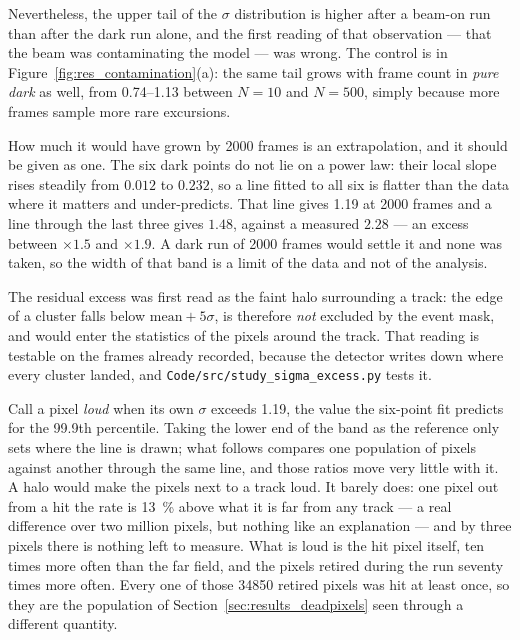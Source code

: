 \documentclass[a4paper,headsepline,oneside,11pt]{scrartcl}
\begin{document}
Nevertheless, the upper tail of the $\sigma$ distribution is higher after a
beam-on run than after the dark run alone, and the first reading of that
observation --- that the beam was contaminating the model --- was wrong. The
control is in Figure~\ref{fig:res_contamination}(a): the same tail grows with
frame count in \emph{pure dark} as well, from \SIrange[range-phrase={ to }]{0.74}{1.13}{\ADU} between
$N=10$ and $N=500$, simply because more frames sample more rare excursions.

How much it would have grown by 2000 frames is an extrapolation, and it should
be given as one. The six dark points do not lie on a power law: their local
slope rises steadily from $0.012$ to $0.232$, so a line fitted to all six is
flatter than the data where it matters and under-predicts. That line gives
\SI{1.19}{\ADU} at 2000 frames and a line through the last three gives $1.48$,
against a measured $2.28$ --- an excess between $\times 1.5$ and $\times 1.9$.
A dark run of 2000 frames would settle it and none was taken, so the width of
that band is a limit of the data and not of the analysis.

The residual excess was first read as the faint halo surrounding a track: the
edge of a cluster falls below $\text{mean} + 5\sigma$, is therefore \emph{not}
excluded by the event mask, and would enter the statistics of the pixels around
the track. That reading is testable on the frames already recorded, because the
detector writes down where every cluster landed, and
\texttt{Code/src/study\_sigma\_excess.py} tests it.

Call a pixel \emph{loud} when its own $\sigma$ exceeds \SI{1.19}{\ADU}, the
value the six-point fit predicts for the 99.9th percentile. Taking the lower end
of the band as the reference only sets where the line is drawn; what follows
compares one population of pixels against another through the same line, and
those ratios move very little with it. A halo would make the
pixels next to a track loud. It barely does: one pixel out from a hit the rate
is \SI{13}{\percent} above what it is far from any track --- a real difference
over two million pixels, but nothing like an explanation --- and by three pixels
there is nothing left to measure. What is loud is the hit pixel itself, ten
times more often than the far field, and the pixels retired during the run
seventy times more often. Every one of those \num{34850} retired pixels was hit
at least once, so they are the population of
Section~\ref{sec:results_deadpixels} seen through a different quantity.
\end{document}
